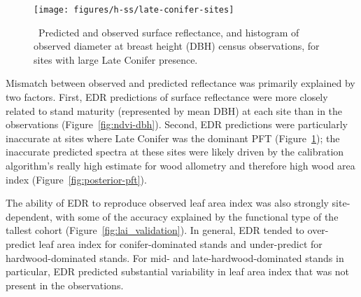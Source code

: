 \begin{figure}[ht]
  \centering
  \texttt{[image: figures/h-ss/late-conifer-sites]}
  \caption{\label{fig:late-conifer-sites}\
    Predicted and observed surface reflectance, and histogram of observed diameter at breast height (DBH) census observations,
    for sites with large Late Conifer presence.
  }
\end{figure}

Mismatch between observed and predicted reflectance was primarily explained by two factors.
First, EDR predictions of surface reflectance were more closely related to stand maturity (represented by mean DBH) at each site than in the observations (Figure~\ref{fig:ndvi-dbh}).
Second, EDR predictions were particularly inaccurate at sites where Late Conifer was the dominant PFT (Figure~\ref{fig:late-conifer-sites});
the inaccurate predicted spectra at these sites were likely driven by the calibration algorithm's really high estimate for wood allometry and therefore high wood area index (Figure~\ref{fig:posterior-pft}).



The ability of EDR to reproduce observed leaf area index was also strongly site-dependent, with some of the accuracy explained by the functional type of the tallest cohort (Figure~\ref{fig:lai_validation}).
In general, EDR tended to over-predict leaf area index for conifer-dominated stands and under-predict for hardwood-dominated stands.
For mid- and late-hardwood-dominated stands in particular, EDR predicted substantial variability in leaf area index that was not present in the observations.

